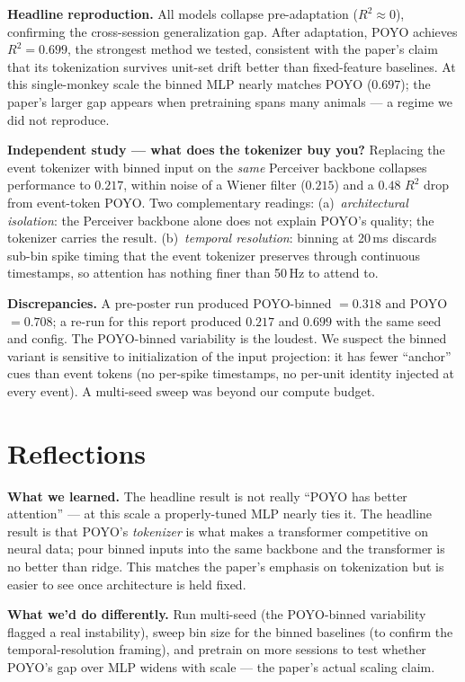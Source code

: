 \documentclass[11pt]{article}
\begin{document}
\textbf{Headline reproduction.} All models collapse pre-adaptation ($R^2 \approx 0$), confirming the cross-session generalization gap. After adaptation, POYO achieves $R^2 = 0.699$, the strongest method we tested, consistent with the paper's claim that its tokenization survives unit-set drift better than fixed-feature baselines. At this single-monkey scale the binned MLP nearly matches POYO ($0.697$); the paper's larger gap appears when pretraining spans many animals --- a regime we did not reproduce.

\textbf{Independent study --- what does the tokenizer buy you?} Replacing the event tokenizer with binned input on the \emph{same} Perceiver backbone collapses performance to $0.217$, within noise of a Wiener filter ($0.215$) and a $0.48$ $R^2$ drop from event-token POYO. Two complementary readings: (a)~\emph{architectural isolation}: the Perceiver backbone alone does not explain POYO's quality; the tokenizer carries the result. (b)~\emph{temporal resolution}: binning at 20\,ms discards sub-bin spike timing that the event tokenizer preserves through continuous timestamps, so attention has nothing finer than 50\,Hz to attend to.

\textbf{Discrepancies.} A pre-poster run produced POYO-binned $= 0.318$ and POYO $= 0.708$; a re-run for this report produced $0.217$ and $0.699$ with the same seed and config. The POYO-binned variability is the loudest. We suspect the binned variant is sensitive to initialization of the input projection: it has fewer ``anchor'' cues than event tokens (no per-spike timestamps, no per-unit identity injected at every event). A multi-seed sweep was beyond our compute budget.

\section{Reflections}
\textbf{What we learned.} The headline result is not really ``POYO has better attention'' --- at this scale a properly-tuned MLP nearly ties it. The headline result is that POYO's \emph{tokenizer} is what makes a transformer competitive on neural data; pour binned inputs into the same backbone and the transformer is no better than ridge. This matches the paper's emphasis on tokenization but is easier to see once architecture is held fixed.

\textbf{What we'd do differently.} Run multi-seed (the POYO-binned variability flagged a real instability), sweep bin size for the binned baselines (to confirm the temporal-resolution framing), and pretrain on more sessions to test whether POYO's gap over MLP widens with scale --- the paper's actual scaling claim.
\end{document}
